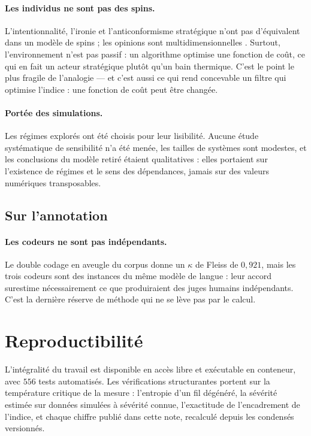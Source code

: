 \documentclass[11pt,a4paper]{article}
\begin{document}
\paragraph{Les individus ne sont pas des spins.} L'intentionnalité, l'ironie et
l'anticonformisme stratégique n'ont pas d'équivalent dans un modèle de spins ; les opinions
sont multidimensionnelles \citep{deffuant2000}. Surtout, l'environnement n'est pas passif : un
algorithme optimise une fonction de coût, ce qui en fait un acteur stratégique plutôt qu'un
bain thermique. C'est le point le plus fragile de l'analogie --- et c'est aussi ce qui rend
concevable un filtre qui optimise l'indice : une fonction de coût peut être changée.

\paragraph{Portée des simulations.} Les régimes explorés ont été choisis pour leur lisibilité.
Aucune étude systématique de sensibilité n'a été menée, les tailles de systèmes sont modestes,
et les conclusions du modèle retiré étaient qualitatives : elles portaient sur
l'existence de régimes et le sens des dépendances, jamais sur des valeurs numériques
transposables.

\subsection{Sur l'annotation}

\paragraph{Les codeurs ne sont pas indépendants.} Le double codage en aveugle du corpus donne
un $\kappa$ de Fleiss de $0{,}921$, mais les trois codeurs sont des instances du même modèle de
langue : leur accord surestime nécessairement ce que produiraient des juges humains
indépendants. C'est la dernière réserve de méthode qui ne se lève pas par le calcul.

\section{Reproductibilité}

L'intégralité du travail est disponible en accès libre et exécutable en conteneur, avec $556$
tests automatisés. Les vérifications structurantes portent sur la température critique
de la mesure : l'entropie d'un fil dégénéré, la sévérité estimée sur données simulées à
sévérité connue, l'exactitude de l'encadrement de l'indice, et chaque chiffre publié dans
cette note, recalculé depuis les condensés versionnés.
\end{document}
